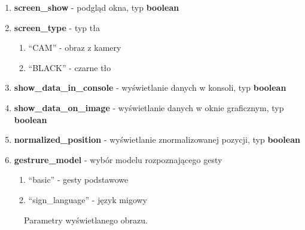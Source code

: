 \begin{enumerate}
    \item \textbf{screen\_show} - podgląd okna, typ \textbf{boolean}
    \item \textbf{screen\_type} - typ tła
    \begin{enumerate}
        \item \enquote{CAM} - obraz z kamery
        \item \enquote{BLACK} - czarne tło
    \end{enumerate}
    \item \textbf{show\_data\_in\_console} - wyświetlanie danych w konsoli, typ \textbf{boolean}
    \item \textbf{show\_data\_on\_image} - wyświetlanie danych w oknie graficznym, typ \textbf{boolean}
    \item \textbf{normalized\_position} - wyświetlanie znormalizowanej pozycji, typ \textbf{boolean}
    \item \textbf{gestrure\_model} - wybór modelu rozpoznającego gesty
    \begin{enumerate}
        \item \enquote{basic} - gesty podstawowe
        \item \enquote{sign\_language} - język migowy
    \end{enumerate}
\end{enumerate}


\begin{figure}[H]
    \centering
    \hfill
    \caption{Parametry wyświetlanego obrazu.}
\end{figure}

